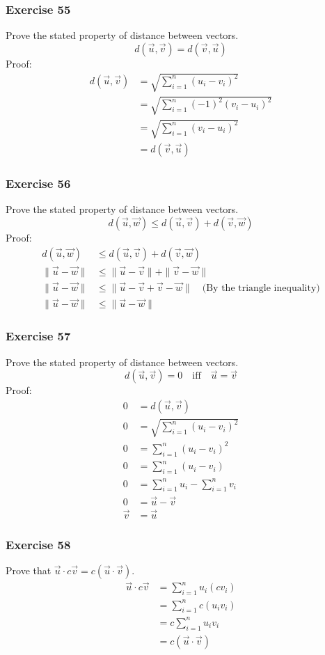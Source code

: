 \documentclass[letterpaper, 12pt]{math}
\begin{document}
\subsubsection*{Exercise 55}
Prove the stated property of distance between vectors.
\[ d(\vec{u},\vec{v}) = d(\vec{v},\vec{u}) \]
Proof:
\begin{align*}
  d(\vec{u},\vec{v}) &= \sqrt{\sum_{i=1}^{n}(u_i-v_i)^2} \\
  &= \sqrt{\sum_{i=1}^{n}(-1)^2(v_i-u_i)^2} \\
  &= \sqrt{\sum_{i=1}^{n}(v_i-u_i)^2} \\
  &= d(\vec{v},\vec{u})
\end{align*}

\subsubsection*{Exercise 56}
Prove the stated property of distance between vectors.
\[ d(\vec{u},\vec{w}) \le d(\vec{u},\vec{v})+d(\vec{v},\vec{w}) \]
Proof:
\begin{align*}
  d(\vec{u},\vec{w}) &\le d(\vec{u},\vec{v})+d(\vec{v},\vec{w}) \\
  \|\vec{u}-\vec{w}\| &\le \|\vec{u}-\vec{v}\|+\|\vec{v}-\vec{w}\| \\
  \|\vec{u}-\vec{w}\| &\le \|\vec{u}-\vec{v}+\vec{v}-\vec{w}\|
    \quad\text{(By the triangle inequality)} \\
  \|\vec{u}-\vec{w}\| &\le \|\vec{u}-\vec{w}\|
\end{align*}

\subsubsection*{Exercise 57}
Prove the stated property of distance between vectors.
\[ d(\vec{u},\vec{v}) = 0 \quad\text{iff}\quad \vec{u} = \vec{v} \]
Proof:
\begin{align*}
  0 &= d(\vec{u},\vec{v}) \\
  0 &= \sqrt{\sum_{i=1}^{n}(u_i-v_i)^2} \\
  0 &= \sum_{i=1}^{n}(u_i-v_i)^2 \\
  0 &= \sum_{i=1}^{n}(u_i-v_i) \\
  0 &= \sum_{i=1}^{n}u_i-\sum_{i=1}^{n}v_i \\
  0 &= \vec{u}-\vec{v} \\
  \vec{v} &= \vec{u}
\end{align*}

\subsubsection*{Exercise 58}
Prove that \( \vec{u}\cdot c\vec{v} = c(\vec{u}\cdot\vec{v}) \).
\begin{align*}
  \vec{u}\cdot c\vec{v} &= \sum_{i=1}^{n}u_{i}(cv_{i}) \\
  &= \sum_{i=1}^{n}c(u_{i}v_{i}) \\
  &= c\sum_{i=1}^{n}u_{i}v_{i} \\
  &= c(\vec{u}\cdot\vec{v})
\end{align*}
\end{document}
